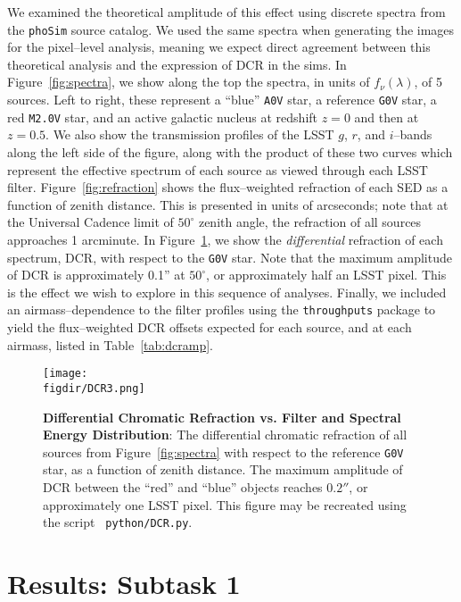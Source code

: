 \documentclass[prd, nofootinbib, floatfix, 11pt, tightenlines, times]{article}
\def\figdir{../figures}
\begin{document}
We examined the theoretical amplitude of this effect using discrete
spectra from the {\tt phoSim} source catalog.  We used the same
spectra when generating the images for the pixel--level analysis,
meaning we expect direct agreement between this theoretical analysis
and the expression of DCR in the sims.  In Figure~\ref{fig:spectra},
we show along the top the spectra, in units of $f_\nu(\lambda)$, of 5
sources.  Left to right, these represent a ``blue'' {\tt A0V} star, a
reference {\tt G0V} star, a red {\tt M2.0V} star, and an active
galactic nucleus at redshift $z=0$ and then at $z=0.5$.  We also show
the transmission profiles of the LSST $g$, $r$, and $i$--bands along
the left side of the figure, along with the product of these two
curves which represent the effective spectrum of each source as viewed
through each LSST filter.  Figure~\ref{fig:refraction} shows the
flux--weighted refraction of each SED as a function of zenith
distance.  This is presented in units of arcseconds; note that at the
Universal Cadence limit of $50^{\circ}$ zenith angle, the refraction
of all sources approaches 1 arcminute.  In Figure~\ref{fig:dcr}, we
show the {\it differential} refraction of each spectrum, DCR, with
respect to the {\tt G0V} star.  Note that the maximum amplitude of DCR
is approximately 0.1'' at $50^{\circ}$, or approximately half an LSST
pixel.  This is the effect we wish to explore in this sequence of
analyses.  Finally, we included an airmass--dependence to the filter
profiles using the {\tt throughputs} package to yield the
flux--weighted DCR offsets expected for each source, and at each
airmass, listed in Table~\ref{tab:dcramp}.

\begin{figure}[!t]
  \centering
  \texttt{[image: \\figdir/DCR3.png]}
  \caption{{\bf Differential Chromatic Refraction vs. Filter and
      Spectral Energy Distribution}: The differential chromatic
    refraction of all sources from Figure~\ref{fig:spectra} with
    respect to the reference {\tt G0V} star, as a function of zenith
    distance.  The maximum amplitude of DCR between the ``red'' and
    ``blue'' objects reaches $0.2''$, or approximately one LSST pixel.
    This figure may be recreated using the script {\tt
      python/DCR.py}.}
  \label{fig:dcr}
\end{figure}



\section{Results: Subtask 1 \label{sec:task1}}
\end{document}
